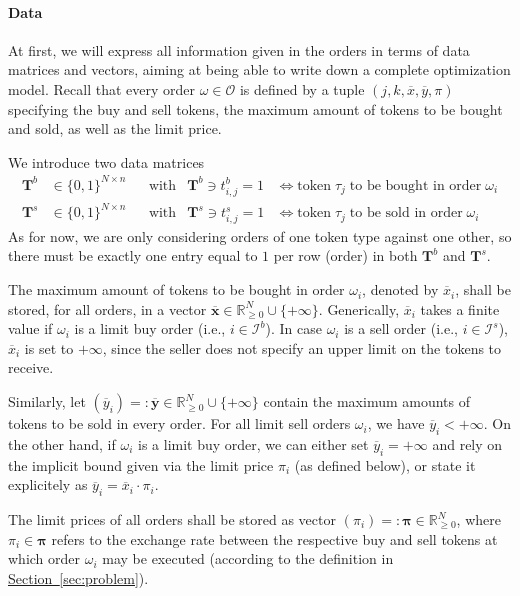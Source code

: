 \documentclass[11pt,parskip=full]{scrartcl}%
\newcommand*{\ie}{i.e., }
\newcommand*{\orders}{\mathcal{O}}          %
\newcommand*{\ibuyorders}{\mathcal{I}^b}    %
\newcommand*{\isellorders}{\mathcal{I}^s}   %
\newcommand*{\subsecref}[1]{\hyperref[{#1}]{Section~\ref*{#1}}}
\begin{document}
\vspace{-.2cm}
\paragraph{Data}

At first, we will express all information given in the orders in terms of data matrices and
vectors, aiming at being able to write down a complete optimization model.
Recall that every order $ \omega \in \orders $ is defined by a tuple
$ (j,k,\overline{x},\overline{y},\pi) $ specifying the buy and sell tokens, the maximum
amount of tokens to be bought and sold, as well as the limit price.

We introduce two data matrices
\begin{align*}
  \mathbf{T}^b &\in \{0,1\}^{N \times n} && \text{with} & \mathbf{T}^b \ni t^b_{i,j} = 1
  &\Leftrightarrow
  \text{token} \; \tau_j \; \text{to be bought in order} \; \omega_i \\
  \mathbf{T}^s &\in \{0,1\}^{N \times n} && \text{with} & \mathbf{T}^s \ni t^s_{i,j} = 1
  &\Leftrightarrow
  \text{token} \; \tau_j \; \text{to be sold in order} \; \omega_i
\end{align*}
As for now, we are only considering orders of one token type against one other, so there must be
exactly one entry equal to $ 1 $ per row (order) in both $ \mathbf{T}^b $ and $ \mathbf{T}^s $.

The maximum amount of tokens to be bought in order $ \omega_i $, denoted by $ \overline{x}_i $,
shall be stored, for all orders, in a vector
$ \overline{\mathbf{x}} \in \mathbb{R}^N_{\ge 0} \cup \{+\infty\} $.
Generically, $ \overline{x}_i $ takes a finite value if $ \omega_i $ is a limit buy order
(\ie $ i \in \ibuyorders $).
In case $ \omega_i $ is a sell order (\ie $ i \in \isellorders $), $ \overline{x}_i $ is set to
$ +\infty $, since the seller does not specify an upper limit on the tokens to receive.

Similarly, let
$ (\overline{y}_i) =: \overline{\mathbf{y}} \in \mathbb{R}^N_{\ge 0} \cup \{+\infty\} $ contain the
maximum amounts of tokens to be sold in every order.
For all limit sell orders $ \omega_i $, we have $ \overline{y}_i < +\infty $.
On the other hand, if $ \omega_i $ is a limit buy order, we can either set
$ \overline{y}_i = +\infty $ and rely on the implicit bound given via the limit price $ \pi_i $ (as
defined below), or state it explicitely as $ \overline{y}_i = \overline{x}_i \cdot \pi_i $.

The limit prices of all orders shall be stored as vector $ (\pi_i) =: \bm{\pi} \in \mathbb{R}^N_
{\ge 0} $, where $ \pi_i \in \bm{\pi} $ refers to the exchange rate between the respective buy and
sell tokens at which order $ \omega_i $ may be executed (according to the definition in
\subsecref{sec:problem}).
\end{document}
